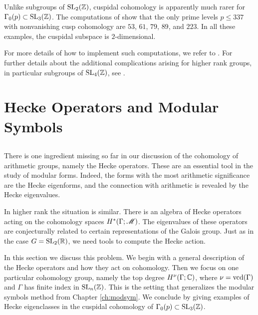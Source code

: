 Unlike subgroups of $\operatorname{SL}_{2} (\mathbb{Z})$, cuspidal cohomology is
apparently much rarer for $\Gamma_{0} (p)\subset \operatorname{SL}_{3} (\mathbb{Z})$.  The
computations of \cite{agg, fourdutch} show that the only prime levels
$p\leq 337$ with nonvanishing cusp cohomology are $53$, $61$, $79$, $89$,
and $223$.  In all these examples, the cuspidal subspace is
$2$-dimensional. 

For more details of how to implement such computations, we refer to
\cite{agg, fourdutch}.  For further details about the additional
complications arising for higher rank groups, in particular subgroups
of $\operatorname{SL}_{4} (\mathbb{Z})$, see \cite[Section~3]{computation}.



\section{Hecke Operators and Modular Symbols}\label{mod.symb.section}
%
\subsection{}
%
There is one ingredient missing so far in our discussion of the
cohomology of arithmetic groups, namely the Hecke operators.
These are an essential tool in the study of modular forms.  Indeed,
the forms with the most arithmetic significance are the Hecke
eigenforms, and the connection with arithmetic is revealed by the
Hecke eigenvalues. 

In higher rank the situation is similar.  There is an algebra of
Hecke operators acting on the cohomology spaces $H^{*} (\Gamma ;
\mathscr M)$. The eigenvalues of these operators are conjecturally related
to certain representations of the Galois group.  Just as in the case
$G=\operatorname{SL}_{2} (\mathbb{R})$, we need tools to compute the Hecke action.

In this section we discuss this problem.  We begin with a general
description of the Hecke operators and how they act on cohomology.
Then we focus on one particular cohomology group, namely the top
degree $H^{\nu} (\Gamma ;\mathbb{C})$, where $\nu =\operatorname{vcd} (\Gamma)$ and $\Gamma$
has finite index in $\operatorname{SL}_{n} (\mathbb{Z})$.  This is the setting that
generalizes the modular symbols method from Chapter \ref{ch:modsym}.
We conclude by giving examples of Hecke eigenclasses in the cuspidal
cohomology of $\Gamma_{0} (p)\subset \operatorname{SL}_{3} (\mathbb{Z})$.


